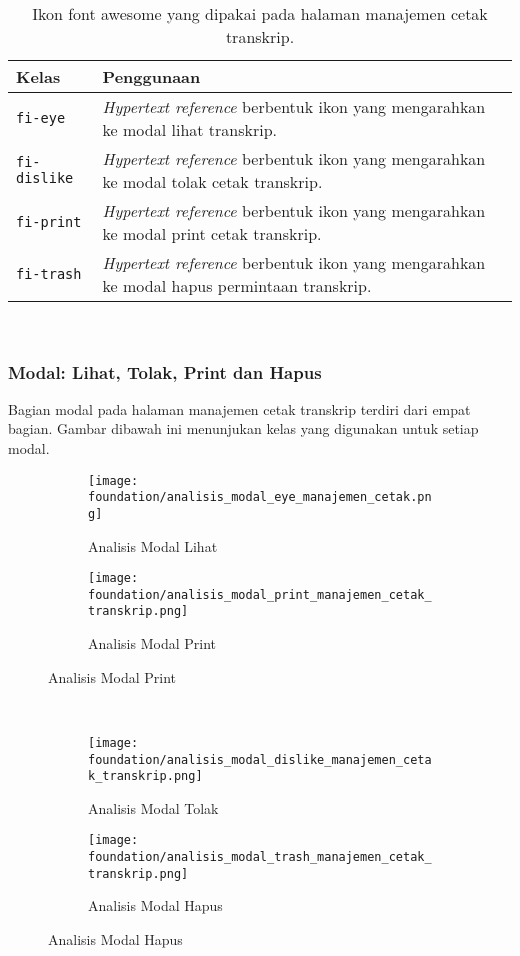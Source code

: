\begin{table}[H]
	\centering
	\begin{tabularx}{\textwidth}{lX}
		\toprule
		Kelas     & Penggunaan \\
		\midrule
		\texttt{fi-eye} & \textit{Hypertext reference} berbentuk ikon yang mengarahkan ke modal lihat transkrip.\\
		\texttt{fi-dislike} & \textit{Hypertext reference} berbentuk ikon yang mengarahkan ke modal tolak cetak transkrip.\\
		\texttt{fi-print} & \textit{Hypertext reference} berbentuk ikon yang mengarahkan ke modal print cetak transkrip.\\
		\texttt{fi-trash} & \textit{Hypertext reference} berbentuk ikon yang mengarahkan ke modal hapus permintaan transkrip.\\
		\bottomrule
	\end{tabularx}%
	\caption{Ikon font awesome yang dipakai pada halaman manajemen cetak transkrip.}
\end{table} \\

\subsubsection{Modal: Lihat, Tolak, Print dan Hapus}

Bagian modal pada halaman manajemen cetak transkrip terdiri dari empat bagian. Gambar dibawah ini menunjukan kelas yang digunakan untuk setiap modal.

\begin{figure}	
	\centering
	\begin{subfigure}[t]{7in}
		\centering  
		\texttt{[image: foundation/analisis\_modal\_eye\_manajemen\_cetak.png]}
		\caption{Analisis Modal Lihat} 
	\end{subfigure}
	
	\begin{subfigure}[t]{7in}
		\centering  
		\texttt{[image: foundation/analisis\_modal\_print\_manajemen\_cetak\_transkrip.png]}
		\caption{Analisis Modal Print} 
	\end{subfigure}
\end{figure}
\\
\begin{figure}	
	\centering
	\begin{subfigure}[t]{7in}
		\centering 
		\texttt{[image: foundation/analisis\_modal\_dislike\_manajemen\_cetak\_transkrip.png]}
		\caption{Analisis Modal Tolak}  
	\end{subfigure}
	
	\begin{subfigure}[t]{7in}		  
		\centering  
		\texttt{[image: foundation/analisis\_modal\_trash\_manajemen\_cetak\_transkrip.png]}
		\caption{Analisis Modal Hapus}
	\end{subfigure}
\end{figure}



